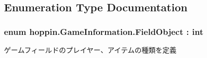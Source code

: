 \subsection{Enumeration Type Documentation}
\subsubsection[{\texorpdfstring{Field\+Object}{FieldObject}}]{\setlength{\rightskip}{0pt plus 5cm}enum {\bf hoppin.\+Game\+Information.\+Field\+Object} \+: int\hspace{0.3cm}{\ttfamily [strong]}}\hypertarget{namespacehoppin_1_1_game_information_a550036a5a24113f1dbc2384284a03d18}{}\label{namespacehoppin_1_1_game_information_a550036a5a24113f1dbc2384284a03d18}


ゲームフィールドのプレイヤー、アイテムの種類を定義 

